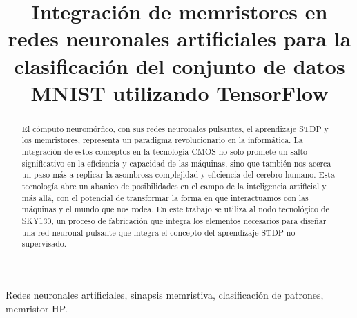 \documentclass[conference]{IEEEtran}
\begin{document}
\title{Integración de memristores en redes neuronales artificiales para la clasificación del conjunto de datos MNIST utilizando TensorFlow\\
}

\author{
\and
{}
}
\maketitle

\begin{abstract}
El cómputo neuromórfico, con sus redes neuronales pulsantes, el aprendizaje STDP y los memristores, representa un paradigma revolucionario en la informática. La integración de estos conceptos en la tecnología CMOS no solo promete un salto significativo en la eficiencia y capacidad de las máquinas, sino que también nos acerca un paso más a replicar la asombrosa complejidad y eficiencia del cerebro humano. Esta tecnología abre un abanico de posibilidades en el campo de la inteligencia artificial y más allá, con el potencial de transformar la forma en que interactuamos con las máquinas y el mundo que nos rodea. En este trabajo se utiliza al nodo tecnológico de SKY130, un proceso de fabricación que integra los elementos necesarios para diseñar una red neuronal pulsante que integra el concepto del aprendizaje STDP no supervisado.
\end{abstract}

\begin{IEEEkeywords}
Redes neuronales artificiales, sinapsis memristiva, clasificación de patrones, memristor HP.
\end{IEEEkeywords}
\end{document}
